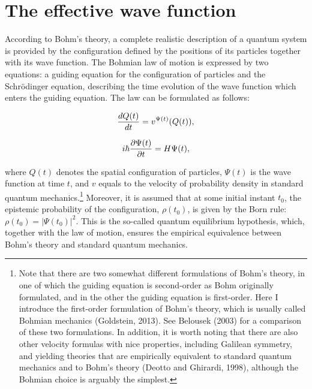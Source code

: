 \section{The effective wave function}

According to Bohm's theory, a complete realistic description of a quantum system is provided by the configuration defined by the positions of its particles together with its wave function. The Bohmian law of motion is expressed by two equations: a guiding equation for the configuration of particles and the Schr\"{o}dinger equation, describing the time evolution of the wave function which enters the guiding equation. The law can be formulated as follows:
              
\begin{equation}
{{dQ(t)} \over {dt}}=v^{\Psi(t)}(Q(t)),
\label{GEf}
\end{equation}

\begin{equation}
i\hbar {\partial \Psi(t) \over \partial t}=H\Psi(t),
\label{Scf}
\end{equation}

\noindent where $Q(t)$ denotes the spatial configuration of particles, $\Psi(t)$ is the wave function at time $t$, and $v$ equals to the velocity of probability density in standard quantum mechanics.\footnote{Note that there are two somewhat different formulations of Bohm's theory, in one of which the guiding equation is second-order as Bohm originally formulated, and in the other the guiding equation is first-order. Here I introduce the first-order formulation of Bohm's theory, which is usually called Bohmian mechanics (Goldstein, 2013). See Belousek (2003) for a comparison of these two formulations. In addition, it is worth noting that there are also other velocity formulas with nice properties, including Galilean symmetry, and yielding theories that are empirically equivalent to standard quantum mechanics and to Bohm's theory (Deotto and Ghirardi, 1998), although the Bohmian choice is arguably the simplest.}
Moreover, it is assumed that at some initial instant $t_0$, the epistemic probability of the configuration, $\rho(t_0)$, is given by the Born rule: $\rho(t_0)=|\Psi(t_0)|^2$. This is the so-called quantum equilibrium hypothesis, which, together with the law of motion, ensures the empirical equivalence between Bohm's theory and standard quantum mechanics.

